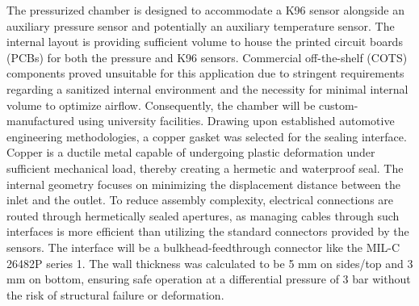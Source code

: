 The pressurized chamber is designed to accommodate a K96 sensor alongside an auxiliary pressure sensor and potentially an auxiliary temperature sensor.
The internal layout is providing sufficient volume to house the printed circuit boards (PCBs) for both the pressure and K96 sensors.
Commercial off-the-shelf (COTS) components proved unsuitable for this application due to stringent requirements regarding a sanitized internal environment and the necessity for minimal internal volume to optimize airflow.
Consequently, the chamber will be custom-manufactured using university facilities.
Drawing upon established automotive engineering methodologies, a copper gasket was selected for the sealing interface.
Copper is a ductile metal capable of undergoing plastic deformation under sufficient mechanical load, thereby creating a hermetic and waterproof seal.
The internal geometry focuses on minimizing the displacement distance between the inlet and the outlet. 
To reduce assembly complexity, electrical connections are routed through hermetically sealed apertures, as managing cables through such interfaces is more efficient than utilizing the standard connectors provided by the sensors.
The interface will be a bulkhead-feedthrough connector like the MIL-C 26482P series 1. 
The wall thickness was calculated to be 5 mm on sides/top and 3 mm on bottom, ensuring safe operation at a differential pressure of 3 bar without the risk of structural failure or deformation.\par

